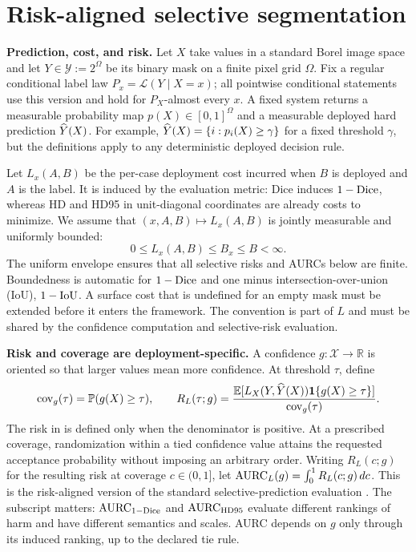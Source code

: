 \section{Risk-aligned selective segmentation}
\label{sec:setup}

\noindent\textbf{Prediction, cost, and risk.}
Let \(X\) take values in a standard Borel image space and let
\(Y\in\mathcal Y:=2^\Omega\) be its binary mask on a finite pixel grid
\(\Omega\). Fix a regular conditional label law
\(P_x=\mathcal L(Y\mid X=x)\); all pointwise conditional statements use this
version and hold for \(P_X\)-almost every \(x\). A fixed system returns a
measurable probability map \(p(X)\in[0,1]^\Omega\) and a measurable deployed
hard prediction \(\widehat{Y}(X)\). For example,
\(\widehat{Y}(X)=\{i:p_i(X)\geq\gamma\}\) for a fixed threshold \(\gamma\), but the
definitions apply to any deterministic deployed decision rule.

Let \(L_x(A,B)\) be the per-case deployment cost incurred when \(B\) is deployed
and \(A\) is the label. It is induced by the evaluation metric: Dice induces
\(1-\operatorname{Dice}\), whereas HD and HD95 in unit-diagonal coordinates are already
costs to minimize. We
assume that \((x,A,B)\mapsto L_x(A,B)\) is jointly measurable and
uniformly bounded:
\begin{equation}
  0\leq L_x(A,B)\leq B_x\leq B<\infty.
  \label{eq:bounded-assumption}
\end{equation}
The uniform envelope ensures that all selective risks and AURCs below are
finite.
Boundedness is automatic for \(1-\operatorname{Dice}\) and one minus intersection-over-union
(IoU), \(1-\operatorname{IoU}\). A surface cost that
is undefined for an empty mask must be extended before it enters the framework.
The convention is part of \(L\) and must be shared by the confidence computation
and selective-risk evaluation.

\noindent\textbf{Risk and coverage are deployment-specific.}
A confidence \(g:\mathcal X\to\mathbb R\) is oriented so that larger values mean
more confidence. At threshold \(\tau\), define
\begin{equation}
  \operatorname{cov}_g(\tau)=\mathbb{P}(g(X)\geq\tau),\qquad
  R_L(\tau;g)=
  \frac{\mathbb{E}[L_X(Y,\widehat{Y}(X))\mathbf 1\{g(X)\geq\tau\}]}
       {\operatorname{cov}_g(\tau)} .
  \label{eq:risk-coverage}
\end{equation}
The risk in  is defined only when the
denominator is positive. At a prescribed coverage, randomization within a tied
confidence value attains the requested acceptance probability without imposing
an arbitrary order. Writing \(R_L(c;g)\) for the resulting risk at coverage
\(c\in(0,1]\), let \(\operatorname{AURC}_L(g)=\int_0^1 R_L(c;g)\,dc\).
This is the risk-aligned version of the standard selective-prediction evaluation
\citep{geifman2017selective,selectivenet}. The subscript matters:
\(\operatorname{AURC}_{1-\operatorname{Dice}}\) and \(\operatorname{AURC}_{\operatorname{HD95}}\) evaluate different rankings of harm
and have different semantics and scales. AURC depends on \(g\) only through its induced ranking,
up to the declared tie rule.

